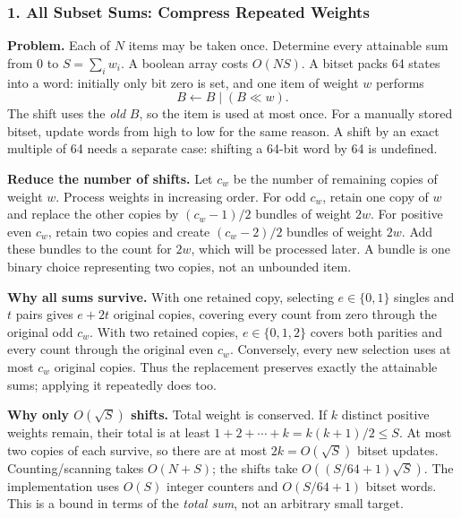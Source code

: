 \subsubsection{1. All Subset Sums: Compress Repeated Weights}
\textbf{Problem.} Each of $N$ items may be taken once. Determine every
attainable sum from $0$ to $S=\sum_i w_i$. A boolean array costs $O(NS)$.
A bitset packs 64 states into a word: initially only bit zero is set,
and one item of weight $w$ performs
\[
 B\gets B\mathbin{\vert}(B\ll w).
\]
The shift uses the \emph{old} $B$, so the item is used at most once.
For a manually stored bitset, update words from high to low for the
same reason. A shift by an exact multiple of 64 needs a separate
case: shifting a 64-bit word by 64 is undefined.

\textbf{Reduce the number of shifts.} Let $c_w$ be the number of
remaining copies of weight $w$. Process weights in increasing order.
For odd $c_w$, retain one copy of $w$ and replace the other copies by
$(c_w-1)/2$ bundles of weight $2w$. For positive even $c_w$, retain two
copies and create $(c_w-2)/2$ bundles of weight $2w$.
Add these bundles to the count for $2w$, which will be processed later.
A bundle is one binary choice representing two copies, not an
unbounded item.

\textbf{Why all sums survive.} With one retained copy, selecting
$e\in\{0,1\}$ singles and $t$ pairs gives $e+2t$ original copies,
covering every count from zero through the original odd $c_w$.
With two retained copies, $e\in\{0,1,2\}$ covers both parities and
every count through the original even $c_w$. Conversely, every new
selection uses at most $c_w$ original copies. Thus the replacement
preserves exactly the attainable sums; applying it repeatedly does too.

\textbf{Why only $O(\sqrt S)$ shifts.} Total weight is conserved.
If $k$ distinct positive weights remain, their total is at least
$1+2+\cdots+k=k(k+1)/2\le S$. At most two copies of each survive,
so there are at most $2k=O(\sqrt S)$ bitset updates.
Counting/scanning takes $O(N+S)$; the shifts take
$O((S/64+1)\sqrt S)$. The implementation uses $O(S)$ integer counters
and $O(S/64+1)$ bitset words. This is a bound in terms of the
\emph{total sum}, not an arbitrary small target.

